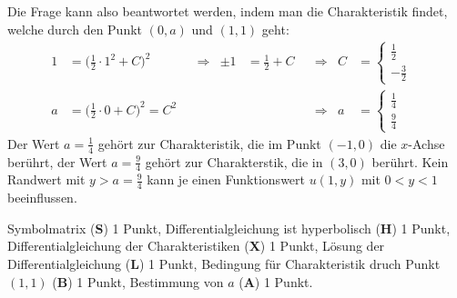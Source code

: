 \begin{loesung}
Die Frage kann also beantwortet werden, indem man die Charakteristik
findet, welche durch den Punkt $(0,a)$ und $(1,1)$ geht:
\begin{align*}
1&=\biggl(\frac12\cdot 1^2 + C\biggr)^2&&\Rightarrow& \pm1&=\frac12 + C&&\Rightarrow& C&=\begin{cases}\frac12&\\-\frac32\end{cases}\\
a&=\biggl(\frac12\cdot 0 + C\biggr)^2=C^2&&           &     &            &&\Rightarrow& a&=\begin{cases}\frac14&\\\frac94&\end{cases}
\end{align*}
Der Wert $a=\frac14$ gehört zur Charakteristik, die im Punkt $(-1,0)$
die $x$-Achse berührt, der Wert $a=\frac94$ gehört zur Charakterstik,
die in $(3,0)$ berührt.
Kein Randwert mit $y>a=\frac94$ kann je einen Funktionswert $u(1,y)$ mit $0<y<1$
beeinflussen.
\end{loesung}

\begin{bewertung}
Symbolmatrix ({\bf S}) 1 Punkt,
Differentialgleichung ist hyperbolisch ({\bf H}) 1 Punkt,
Differentialgleichung der Charakteristiken ({\bf X}) 1 Punkt,
Lösung der Differentialgleichung ({\bf L}) 1 Punkt,
Bedingung für Charakteristik druch Punkt $(1,1)$ ({\bf B}) 1 Punkt,
Bestimmung von $a$ ({\bf A}) 1 Punkt.
\end{bewertung}
